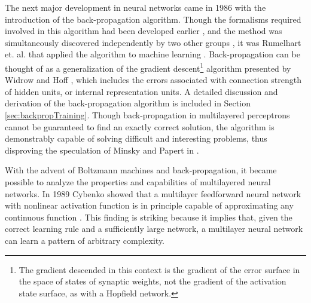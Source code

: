 \documentclass[11pt]{afthesis}
\begin{document}
	The next major development in neural networks came in 1986 with the introduction of the back-propagation algorithm. Though the formalisms required involved in this algorithm had been developed earlier \cite{bryson1969optimalcontrol} \cite{werbos1974beyondregression}, and the method was simultaneously discovered independently by two other groups \cite{parker1985logic} \cite{lecun1985}, it was Rumelhart et. al. that applied the algorithm to machine learning \cite{rumelhart1986internal}. Back-propagation can be thought of as a generalization of the gradient descent\footnote{The gradient descended in this context is the gradient of the error surface in the space of states of synaptic weights, not the gradient of the activation state surface, as with a Hopfield network.} algorithm presented by Widrow and Hoff \cite{widrow1960asc}, which includes the errors associated with connection strength of hidden units, or internal representation units. A detailed discussion and derivation of the back-propagation algorithm is included in Section \ref{sec:backpropTraining}. Though back-propagation in multilayered perceptrons cannot be guaranteed to find an exactly correct solution, the algorithm is demonstrably capable of solving difficult and interesting problems, thus disproving the speculation of Minsky and Papert in \cite{minsky1969perceptrons}.
	
	
	With the advent of Boltzmann machines and back-propagation, it became possible to analyze the properties and capabilities of multilayered neural networks. In 1989 Cybenko showed that a multilayer feedforward neural network with nonlinear activation function is in principle capable of approximating any continuous function  \cite{cybenko1989approxsuperposition}. This finding is striking because it implies that, given the correct learning rule and a sufficiently large network, a multilayer neural network can learn a pattern of arbitrary complexity. 
	
	
	
	
\end{document}
